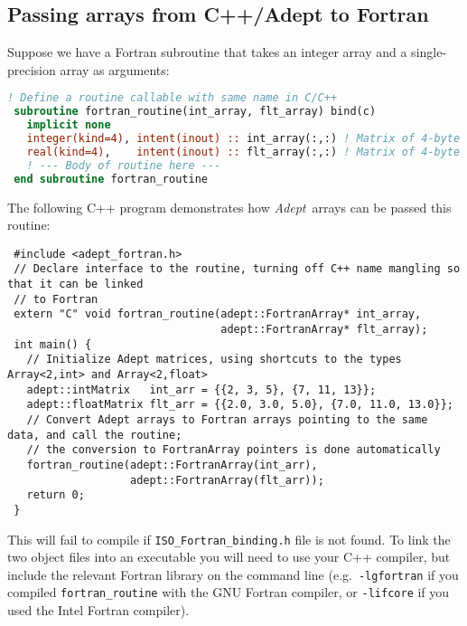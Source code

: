 \documentclass[a4,oneside]{book}
\def\codesize{\small}
\def\Adept{\emph{Adept}}
\def\code#1{{\codesize\texttt{#1}}}
\begin{document}
\subsection{Passing arrays from C++/Adept to Fortran}
Suppose we have a Fortran subroutine that takes an integer array and a
single-precision array as arguments:
\begin{lstlisting}[language=Fortran]
 ! Define a routine callable with same name in C/C++
 subroutine fortran_routine(int_array, flt_array) bind(c)
   implicit none
   integer(kind=4), intent(inout) :: int_array(:,:) ! Matrix of 4-byte integers
   real(kind=4),    intent(inout) :: flt_array(:,:) ! Matrix of 4-byte real numbers
   ! --- Body of routine here ---
 end subroutine fortran_routine
\end{lstlisting}
The following C++ program demonstrates how \Adept\ arrays can be
passed this routine:
\begin{lstlisting}
 #include <adept_fortran.h>
 // Declare interface to the routine, turning off C++ name mangling so that it can be linked
 // to Fortran 
 extern "C" void fortran_routine(adept::FortranArray* int_array,
                                 adept::FortranArray* flt_array);
 int main() {
   // Initialize Adept matrices, using shortcuts to the types Array<2,int> and Array<2,float>
   adept::intMatrix   int_arr = {{2, 3, 5}, {7, 11, 13}};
   adept::floatMatrix flt_arr = {{2.0, 3.0, 5.0}, {7.0, 11.0, 13.0}};
   // Convert Adept arrays to Fortran arrays pointing to the same data, and call the routine;
   // the conversion to FortranArray pointers is done automatically
   fortran_routine(adept::FortranArray(int_arr),
                   adept::FortranArray(flt_arr));
   return 0;
 }
\end{lstlisting}
This will fail to compile if \code{ISO\_Fortran\_binding.h} file is
not found. To link the two object files into an executable you will
need to use your C++ compiler, but include the relevant Fortran
library on the command line (e.g.\ \code{-lgfortran} if you compiled
\code{fortran\_routine} with the GNU Fortran compiler, or
\code{-lifcore} if you used the Intel Fortran compiler).
\end{document}
